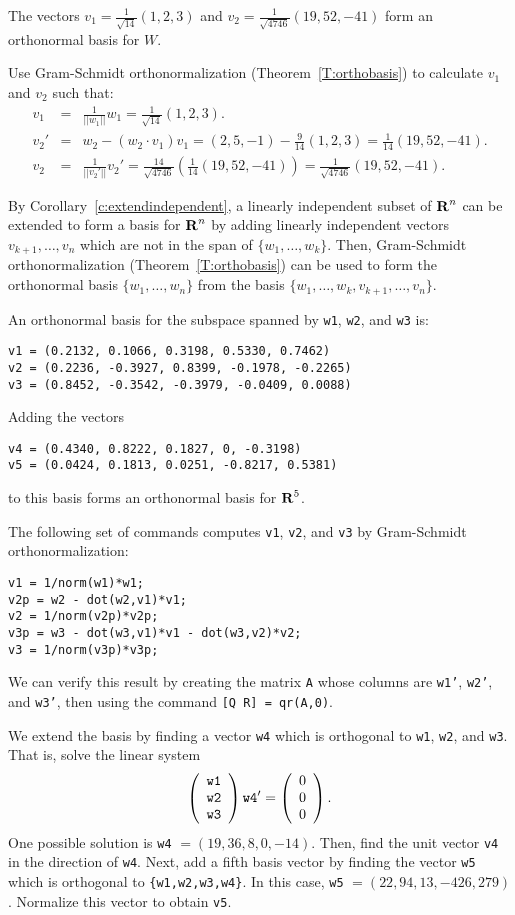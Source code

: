 \ans The vectors $v_1 = \frac{1}{\sqrt{14}}(1,2,3)$ and
$v_2 = \frac{1}{\sqrt{4746}}(19,52,-41)$ form an orthonormal basis
for $W$.

\soln Use Gram-Schmidt orthonormalization
(Theorem~\ref{T:orthobasis}) to calculate $v_1$ and $v_2$ such that:
\[
\begin{array}{rcl}
v_1 & = & \frac{1}{||w_1||}w_1 = \frac{1}{\sqrt{14}}(1,2,3). \\
v_2' & = & w_2 - (w_2 \cdot v_1)v_1 = (2,5,-1) -
\frac{9}{14}(1,2,3) = \frac{1}{14}(19,52,-41). \\
v_2 & = & \frac{1}{||v_2'||}v_2' = \frac{14}{\sqrt{4746}}
\left(\frac{1}{14}(19,52,-41)\right) = \frac{1}{\sqrt{4746}}
(19,52,-41).
\end{array}
\]

By Corollary~\ref{c:extendindependent},
a linearly independent subset of $\mbox{$\bf{R}$}^n$ can be extended to form a
basis for $\mbox{$\bf{R}$}^n$ by adding linearly independent vectors
$v_{k+1},\ldots,v_n$ which are not in the span of
$\{w_1,\ldots,w_k\}$.  Then, Gram-Schmidt orthonormalization
(Theorem~\ref{T:orthobasis}) can be used
to form the orthonormal basis $\{w_1,\ldots,w_n\}$ from the basis
$\{w_1,\ldots,w_k,v_{k+1},\ldots,v_n\}$.

\ans
An orthonormal basis for the subspace spanned by {\tt w1}, {\tt w2},
and {\tt w3} is:
\begin{verbatim}
v1 = (0.2132, 0.1066, 0.3198, 0.5330, 0.7462)
v2 = (0.2236, -0.3927, 0.8399, -0.1978, -0.2265)
v3 = (0.8452, -0.3542, -0.3979, -0.0409, 0.0088)
\end{verbatim}
Adding the vectors
\begin{verbatim}
v4 = (0.4340, 0.8222, 0.1827, 0, -0.3198)
v5 = (0.0424, 0.1813, 0.0251, -0.8217, 0.5381)
\end{verbatim}
to this basis forms an orthonormal basis for $\mbox{$\bf{R}$}^5$.

\soln The following set of \Matlab commands computes {\tt v1}, {\tt v2},
and {\tt v3} by Gram-Schmidt orthonormalization:
\begin{verbatim}
v1 = 1/norm(w1)*w1;
v2p = w2 - dot(w2,v1)*v1;
v2 = 1/norm(v2p)*v2p;
v3p = w3 - dot(w3,v1)*v1 - dot(w3,v2)*v2;
v3 = 1/norm(v3p)*v3p;
\end{verbatim}
We can verify this result by creating the matrix {\tt A} whose columns
are {\tt w1'}, {\tt w2'}, and {\tt w3'}, then using the command
{\tt [Q R] = qr(A,0)}.

\para We extend the basis by finding a vector {\tt w4} which is
orthogonal to {\tt w1}, {\tt w2}, and {\tt w3}.  That is, solve the
linear system
\[
\left(\begin{array}{r} {\tt w1} \\ {\tt w2} \\ {\tt w3}\end{array}\right){\tt w4'} = \left(\begin{array}{r} 0 \\ 0 \\ 0\end{array}\right). \]
One possible solution is {\tt w4} $= (19,36,8,0,-14)$.  Then, find
the unit vector {\tt v4} in the direction of {\tt w4}.  Next, add a
fifth basis vector by finding the vector {\tt w5} which is orthogonal
to {\tt \{w1,w2,w3,w4\}}.  In this case, {\tt w5}
$= (22,94,13,-426,279)$.  Normalize this vector to obtain {\tt v5}.


